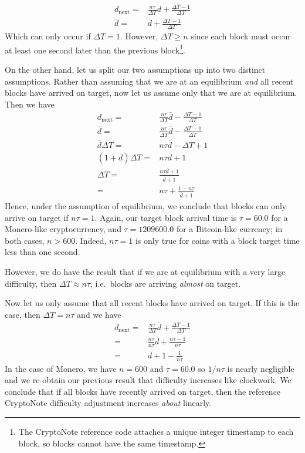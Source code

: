 \documentclass[12pt,english]{mrl}
\theoremstyle{definition}
\renewcommand{\geq}{\geqslant}
\numberwithin{equation}{section}
\numberwithin{figure}{section}
\numberwithin{equation}{section}
\numberwithin{equation}{section}
\numberwithin{figure}{section}
\begin{document}
\begin{align*}
d_{\text{next}} =& \frac{n\tau}{\Delta T}\overline{d} + \frac{\Delta T - 1}{\Delta T}\\
\overline{d} =& \overline{d} + \frac{\Delta T - 1}{\Delta T}
\end{align*}
Which can only occur if $\Delta T = 1$. However, $\Delta T \geq n$ since each block must occur at least one second later than the previous block\footnote{The CryptoNote reference code attaches a unique integer timestamp to each block, so blocks cannot have the same timestamp.}. 

On the other hand, let us split our two assumptions up into two distinct assumptions. Rather than assuming that we are at an equilibrium \emph{and} all recent blocks have arrived on target, now let us assume only that we are at equilibrium. Then we have
\begin{align*}
d_{\text{next}} =& \frac{n\tau}{\Delta T} \overline{d} - \frac{\Delta T - 1}{\Delta T}\\
\overline{d} =& \frac{n \tau}{\Delta T} \overline{d} - \frac{\Delta T - 1}{\Delta T}\\
\overline{d} \Delta T =& n\tau \overline{d} - \Delta T + 1\\
(1+\overline{d})\Delta T =& n\tau \overline{d} + 1\\
\Delta T =& \frac{n \tau \overline{d} + 1}{\overline{d} + 1}\\
=& n\tau + \frac{1 - n\tau}{\overline{d} + 1}
\end{align*}
Hence, under the assumption of equilibrium, we conclude that blocks can only arrive on target if $n\tau = 1$. Again, our target block arrival time is $\tau = 60.0$ for a Monero-like cryptocurrency, and $\tau = 1209600.0$ for a Bitcoin-like currency; in both cases, $n > 600$. Indeed, $n\tau = 1$ is only true for coins with a block target time less than one second. 

However, we do have the result that if we are at equilibrium with a very large difficulty, then $\Delta T \approx n\tau$, i.e.\ blocks are arriving \textit{almost} on target.

Now let us only assume that all recent blocks have arrived on target. If this is the case, then $\Delta T = n\tau$ and we have
\begin{align*}
d_{\text{next}} =& \frac{n\tau}{\Delta T}\overline{d} + \frac{\Delta T - 1}{\Delta T}\\
=& \frac{n\tau}{n\tau}\overline{d} + \frac{n\tau - 1}{n\tau}\\
=& \overline{d} + 1 - \frac{1}{n\tau}
\end{align*}
In the case of Monero, we have $n = 600$ and $\tau = 60.0$ so $1/n\tau$ is nearly negligible and we re-obtain our previous result that difficulty increases like clockwork. We conclude that if all blocks have recently arrived on target, then the reference CryptoNote difficulty adjustment increases \emph{about} linearly.
\end{document}
